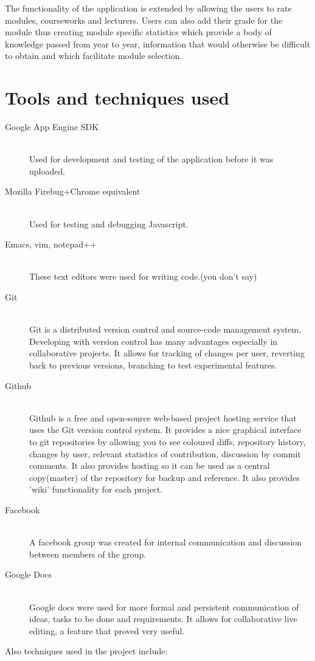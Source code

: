 \documentclass[12pt,a4paper,titlepage]{article}
\begin{document}
The functionality of the application is extended by allowing the users to rate modules, courseworks and lecturers. Users can also add their grade for the module thus creating module specific statistics which provide a body of knowledge passed from year to year, information that would otherwise be difficult to obtain and which facilitate module selection. 
\newpage
\section{Tools and techniques used}
 \begin{description}
 \item[Google App Engine SDK]\hfill\\
  Used for development and testing of the application before it was uploaded.
\item[Mozilla Firebug+Chrome equivalent]\hfill\\
  Used for testing and debugging Javascript.
  \item[Emacs, vim, notepad++] \hfill \\
  These text editors were used for writing code.(you don't say)
  \item[Git] \hfill \\
  Git is a distributed version control and source-code management system. Developing with version control has many advantages especially in collaborative projects. It allows for tracking of changes per user, reverting back to previous versions, branching to test experimental features. 
  \item[Github] \hfill \\
  Github is a free and open-source web-based project hosting service that uses the Git version control system.  It provides a nice graphical interface to git repositories by allowing you to see coloured diffs, repository history, changes by user, relevant statistics of contribution, discussion by commit comments. It also provides hosting so it can be used as a central copy(master) of the repository for backup and reference. It also provides 'wiki' functionality for each project.
\item[Facebook] \hfill \\
  A facebook group was created for internal communication and discussion between members of the group. 
\item[Google Docs] \hfill \\
  Google docs were used for more formal and persistent communication of ideas, tasks to be done and requirements. It allows for collaborative live editing, a feature that proved very useful.
\end{description}
Also techniques used in the project include:
\newpage
\end{document}
